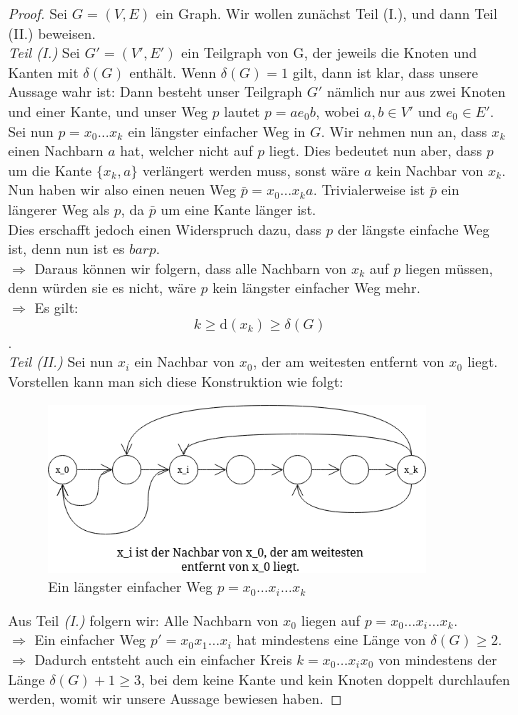 \documentclass{article}
\theoremstyle{plain}
\begin{document}
\begin{proof}
	Sei $G = (V, E)$ ein Graph. Wir wollen zunächst Teil (I.), und dann Teil (II.) beweisen.\\
	\emph{Teil (I.)} Sei $G' = (V', E')$ ein Teilgraph von G, der jeweils die Knoten und Kanten mit $\delta(G)$ enthält. Wenn $\delta(G) = 1$ gilt, dann ist klar, dass unsere Aussage wahr ist: Dann besteht unser Teilgraph $G'$ nämlich nur aus zwei Knoten und einer Kante, und unser Weg $p$ lautet $p = ae_0b$, wobei $a, b \in V'$ und $e_0 \in E'$.\\
	Sei nun $p = x_0 \ldots x_k$ ein längster einfacher Weg in $G$. Wir nehmen nun an, dass $x_k$ einen Nachbarn $a$ hat, welcher nicht auf $p$ liegt. Dies bedeutet nun aber, dass $p$ um die Kante $\{x_k, a\}$ verlängert werden muss, sonst wäre $a$ kein Nachbar von $x_k$.\\
	Nun haben wir also einen neuen Weg $\bar{p} = x_0 \ldots x_k a$. Trivialerweise ist $\bar{p}$ ein längerer Weg als $p$, da $\bar{p}$ um eine Kante länger ist.\\
	Dies erschafft jedoch einen Widerspruch dazu, dass $p$ der längste einfache Weg ist, denn nun ist es $bar{p}$.\\
	$\Rightarrow$ Daraus können wir folgern, dass alle Nachbarn von $x_k$ auf $p$ liegen müssen, denn würden sie es nicht, wäre $p$ kein längster einfacher Weg mehr.\\
	$\Rightarrow$ Es gilt: $$k \ge \text{d}(x_k) \geq \delta(G)$$.\\
	\emph{Teil (II.)} Sei nun $x_i$ ein Nachbar von $x_0$, der am weitesten entfernt von $x_0$ liegt. Vorstellen kann man sich diese Konstruktion wie folgt:\\
    \vfill
	\begin{figure}[htp]
	    \centering
	    \includegraphics[width=10cm]{vortrag_schriftlich/images/proof_thm.drawio.png}
	    \caption{Ein längster einfacher Weg $p = x_0 \ldots x_i \ldots x_k$}
	    \label{fig:fig8}
	\end{figure}
    \vfill
	Aus Teil \emph{(I.)} folgern wir: Alle Nachbarn von $x_0$ liegen auf $p = x_0 \ldots x_i \ldots x_k$.\\
	$\Rightarrow$ Ein einfacher Weg $p' = x_0 x_1 \ldots x_i$ hat mindestens eine Länge von $\delta(G) \geq 2$.\\
	$\Rightarrow$ Dadurch entsteht auch ein einfacher Kreis $k = x_0 \ldots x_i x_0$ von mindestens der Länge $\delta(G) + 1 \geq 3$, bei dem keine Kante und kein Knoten doppelt durchlaufen werden, womit wir unsere Aussage bewiesen haben.
\end{proof}
\end{document}
